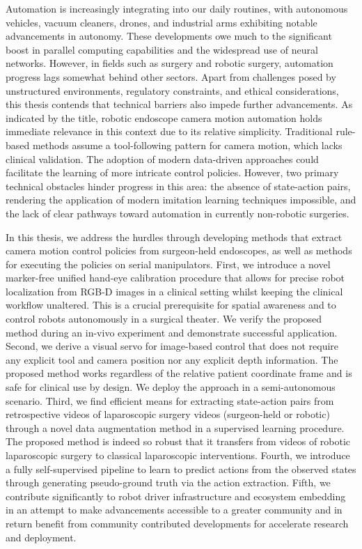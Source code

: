 Automation is increasingly integrating into our daily routines, with autonomous vehicles, vacuum cleaners, drones, and industrial arms exhibiting notable advancements in autonomy. These developments owe much to the significant boost in parallel computing capabilities and the widespread use of neural networks. However, in fields such as surgery and robotic surgery, automation progress lags somewhat behind other sectors. Apart from challenges posed by unstructured environments, regulatory constraints, and ethical considerations, this thesis contends that technical barriers also impede further advancements. As indicated by the title, robotic endoscope camera motion automation holds immediate relevance in this context due to its relative simplicity. Traditional rule-based methods assume a tool-following pattern for camera motion, which lacks clinical validation. The adoption of modern data-driven approaches could facilitate the learning of more intricate control policies. However, two primary technical obstacles hinder progress in this area: the absence of state-action pairs, rendering the application of modern imitation learning techniques impossible, and the lack of clear pathways toward automation in currently non-robotic surgeries.

In this thesis, we address the hurdles through developing methods that extract camera motion control policies from surgeon-held endoscopes, as well as methods for executing the policies on serial manipulators. First, we introduce a novel marker-free unified hand-eye calibration procedure that allows for precise robot localization from RGB-D images in a clinical setting whilst keeping the clinical workflow unaltered. This is a crucial prerequisite for spatial awareness and to control robots autonomously in a surgical theater. We verify the proposed method during an in-vivo experiment and demonstrate successful application. Second, we derive a visual servo for image-based control that does not require any explicit tool and camera position nor any explicit depth information. The proposed method works regardless of the relative patient coordinate frame and is safe for clinical use by design. We deploy the approach in a semi-autonomous scenario.
Third, we find efficient means for extracting state-action pairs from retrospective videos of laparoscopic surgery videos (surgeon-held or robotic) through a novel data augmentation method in a supervised learning procedure. The proposed method is indeed so robust that it transfers from videos of robotic laparoscopic surgery to classical laparoscopic interventions. Fourth, we introduce a fully self-supervised pipeline to learn to predict actions from the observed states through generating pseudo-ground truth via the action extraction. Fifth, we contribute significantly to robot driver infrastructure and ecosystem embedding in an attempt to make advancements accessible to a greater community and in return benefit from community contributed developments for accelerate research and deployment.

